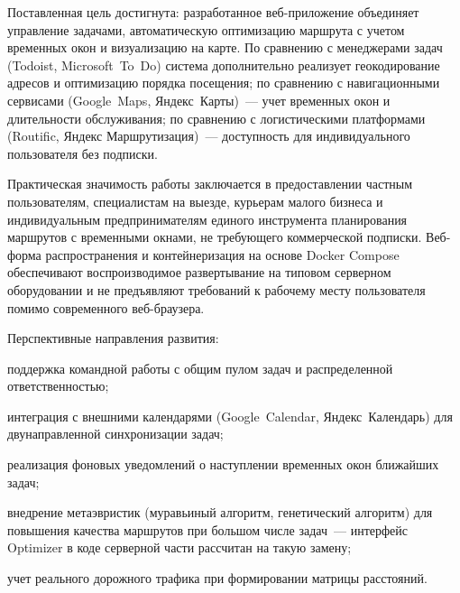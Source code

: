 Поставленная цель достигнута: разработанное веб-приложение объединяет
управление задачами, автоматическую оптимизацию маршрута с учетом
временных окон и визуализацию на карте. По сравнению с менеджерами задач (Todoist,
Microsoft~To~Do) система дополнительно реализует геокодирование адресов
и оптимизацию порядка посещения; по сравнению с навигационными сервисами
(Google~Maps, Яндекс~Карты)~--- учет временных окон и длительности
обслуживания; по сравнению с логистическими платформами
(Routific, Яндекс Маршрутизация)~--- доступность для индивидуального
пользователя без подписки.

Практическая значимость работы заключается в предоставлении частным
пользователям, специалистам на выезде, курьерам малого бизнеса и
индивидуальным предпринимателям единого инструмента планирования
маршрутов с временными окнами, не требующего коммерческой подписки.
Веб-форма распространения и контейнеризация на основе Docker Compose
обеспечивают воспроизводимое развертывание на типовом серверном
оборудовании и не предъявляют требований к рабочему месту пользователя
помимо современного веб-браузера.

Перспективные направления развития:
\begin{compactlist}
      \item поддержка командной работы с общим пулом задач и распределенной
            ответственностью;
      \item интеграция с внешними календарями (Google~Calendar,
            Яндекс~Календарь) для двунаправленной синхронизации задач;
      \item реализация фоновых уведомлений о наступлении временных окон
            ближайших задач;
      \item внедрение метаэвристик (муравьиный алгоритм, генетический
            алгоритм) для повышения качества маршрутов при большом числе
            задач~--- интерфейс Optimizer в коде серверной части
            рассчитан на такую замену;
      \item учет реального дорожного трафика при формировании матрицы
            расстояний.
\end{compactlist}

